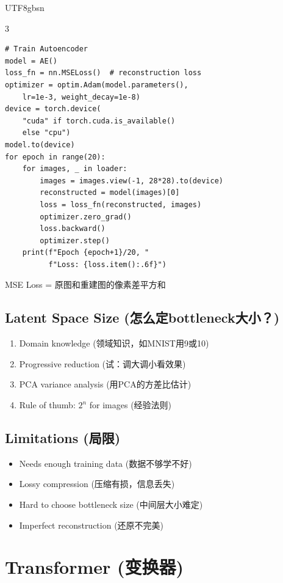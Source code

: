 \documentclass[9pt,landscape,a4paper]{article}
\newcommand{\zhint}[1]{{\scriptsize\color{gray!70!black}#1}}
\begin{document}
\begin{CJK}{UTF8}{gbsn}
\begin{multicols}{3}
\begin{lstlisting}
# Train Autoencoder
model = AE()
loss_fn = nn.MSELoss()  # reconstruction loss
optimizer = optim.Adam(model.parameters(),
    lr=1e-3, weight_decay=1e-8)
device = torch.device(
    "cuda" if torch.cuda.is_available()
    else "cpu")
model.to(device)
for epoch in range(20):
    for images, _ in loader:
        images = images.view(-1, 28*28).to(device)
        reconstructed = model(images)[0]
        loss = loss_fn(reconstructed, images)
        optimizer.zero_grad()
        loss.backward()
        optimizer.step()
    print(f"Epoch {epoch+1}/20, "
          f"Loss: {loss.item():.6f}")
\end{lstlisting}
\zhint{MSE Loss = 原图和重建图的像素差平方和}

\subsection{Latent Space Size \zhint{(怎么定bottleneck大小？)}}
\begin{enumerate}[leftmargin=*, nosep, itemsep=0pt]
    \item Domain knowledge \zhint{(领域知识，如MNIST用9或10)}
    \item Progressive reduction \zhint{(试：调大调小看效果)}
    \item PCA variance analysis \zhint{(用PCA的方差比估计)}
    \item Rule of thumb: $2^n$ for images \zhint{(经验法则)}
\end{enumerate}

\subsection{Limitations \zhint{(局限)}}
\begin{itemize}[leftmargin=*, nosep, itemsep=0pt]
    \item Needs enough training data \zhint{(数据不够学不好)}
    \item Lossy compression \zhint{(压缩有损，信息丢失)}
    \item Hard to choose bottleneck size \zhint{(中间层大小难定)}
    \item Imperfect reconstruction \zhint{(还原不完美)}
\end{itemize}

\section{Transformer \zhint{(变换器)}}


\end{multicols}
\end{CJK}
\end{document}
